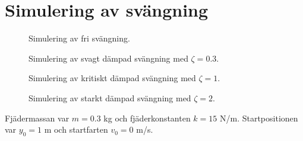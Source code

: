 \documentclass[12pt, a4paper]{article}
\begin{document}
\section{Simulering av svängning}
\begin{figure}[p]
    \centering
    \caption{Simulering av fri svängning.}
    
    \label{fig:oscillation_0_0}
\end{figure}
\begin{figure}[p]
    \centering
    \caption{Simulering av svagt dämpad svängning med $\zeta=0.3$.}
    
    \label{fig:oscillation_0_3}
\end{figure}
\begin{figure}[p]
    \centering
    \caption{Simulering av kritiskt dämpad svängning med $\zeta=1$.}
    
    \label{fig:oscillation_1_0}
\end{figure}
\begin{figure}[p]
    \centering
    \caption{Simulering av starkt dämpad svängning med $\zeta=2$.}
    
    \label{fig:oscillation_2_0}
\end{figure}

Fjädermassan var $m=0.3$ kg och fjäderkonstanten $k=15$ N/m. Startpositionen var $y_0=1$ m och startfarten $v_0=0$ m/s.

\printbibliography
\end{document}

